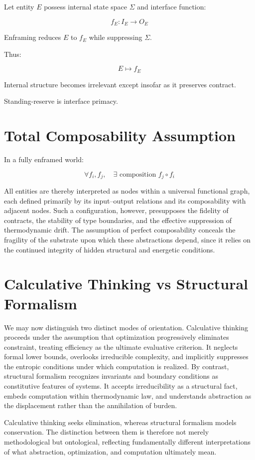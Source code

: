\documentclass[11pt,openany]{book}
\begin{document}
Let entity $E$ possess internal state space $\Sigma$ 
and interface function:

\[
f_E : I_E \to O_E
\]

Enframing reduces $E$ to $f_E$ 
while suppressing $\Sigma$.

Thus:

\[
E \mapsto f_E
\]

Internal structure becomes irrelevant except insofar as it preserves contract.

Standing-reserve is interface primacy.

\section{Total Composability Assumption}

In a fully enframed world:

\[
\forall f_i, f_j, \quad \exists \text{ composition } f_j \circ f_i
\]

All entities are thereby interpreted as nodes within a universal functional graph, 
each defined primarily by its input--output relations and its composability with 
adjacent nodes. Such a configuration, however, presupposes the fidelity of contracts, 
the stability of type boundaries, and the effective suppression of thermodynamic drift. 
The assumption of perfect composability conceals the fragility of the substrate upon 
which these abstractions depend, since it relies on the continued integrity of hidden 
structural and energetic conditions.

\section{Calculative Thinking vs Structural Formalism}

We may now distinguish two distinct modes of orientation. Calculative thinking 
proceeds under the assumption that optimization progressively eliminates constraint, 
treating efficiency as the ultimate evaluative criterion. It neglects formal lower 
bounds, overlooks irreducible complexity, and implicitly suppresses the entropic 
conditions under which computation is realized. By contrast, structural formalism 
recognizes invariants and boundary conditions as constitutive features of systems. 
It accepts irreducibility as a structural fact, embeds computation within thermodynamic 
law, and understands abstraction as the displacement rather than the annihilation of burden. 

Calculative thinking seeks elimination, whereas structural formalism models conservation. 
The distinction between them is therefore not merely methodological but ontological, 
reflecting fundamentally different interpretations of what abstraction, optimization, 
and computation ultimately mean.
\end{document}
